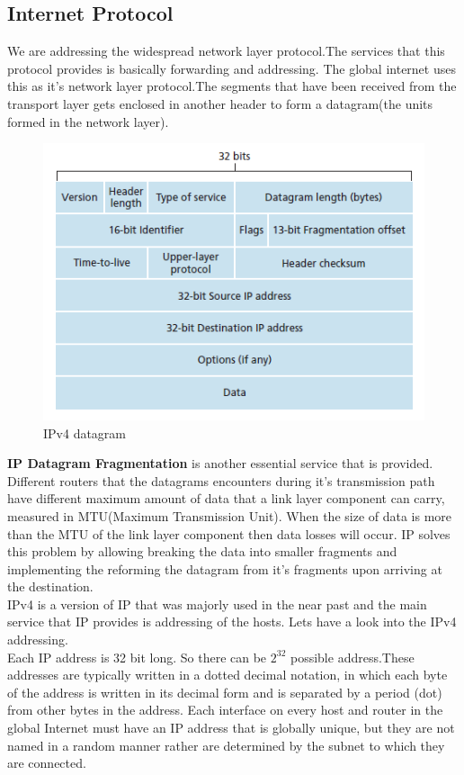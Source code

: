 \documentclass{article}
\begin{document}
\subsection{Internet Protocol}
We are addressing the widespread network layer protocol.The services that this protocol provides is basically forwarding and addressing. The global internet uses this as it's network layer protocol.The segments that have been received from the transport layer gets enclosed in another header to form a datagram(the units formed in the network layer).
\begin{center}
\begin{figure}
    \includegraphics{ip.png}
    \caption{IPv4 datagram}
\end{figure}
\end{center}
\textbf{IP Datagram Fragmentation} is another essential service that is provided. Different routers that the datagrams encounters during it's transmission path have different maximum amount of data that a link layer component can carry, measured in MTU(Maximum Transmission Unit). When the size of data is more than the MTU of the link layer component then data losses will occur. IP solves this problem by allowing breaking the data into smaller fragments and implementing the reforming the datagram from it's fragments upon arriving at the destination.\\
IPv4 is a version of IP that was majorly used in the near past and the main service that IP provides is addressing of the hosts. Lets have a look into the IPv4 addressing.\\
Each IP address is 32 bit long. So there can be $2^{32}$ possible address.These addresses are typically written in a dotted decimal notation, in which each byte of the address is written in its decimal form and is separated by a period (dot) from other bytes in the address. Each interface on every host and router in the global Internet must have an IP address that is globally unique, but they are not named in a random manner rather are determined by the subnet to which they are connected.\\
\end{document}
